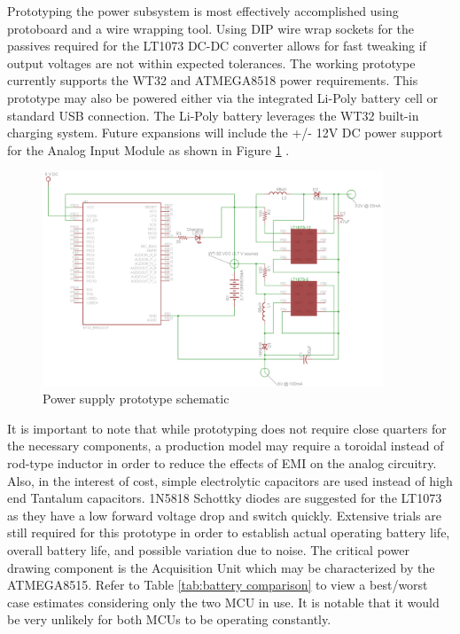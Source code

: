 Prototyping the power subsystem is most effectively accomplished using protoboard and a wire wrapping tool. Using DIP wire wrap sockets for the passives required for the LT1073 DC-DC converter allows for fast tweaking if output voltages are not within expected tolerances. The working prototype currently supports the WT32 and ATMEGA8518 power requirements. This prototype may also be powered either via the integrated Li-Poly battery cell or standard USB connection. The Li-Poly battery leverages the WT32 built-in charging system. Future expansions will include the +/- 12V DC power support for the Analog Input Module as shown in Figure \ref{fig:final_power_schematic} .

\begin{figure}[hbp]
\centering
\includegraphics[width=4in]{../drawings/power_final_sch.png}
\caption[Power Supply]{Power supply prototype schematic}
\label{fig:final_power_schematic}
\end{figure}   

It is important to note that while prototyping does not require close quarters for the necessary components, a production model may require a toroidal instead of rod-type inductor in order to reduce the effects of EMI on the analog circuitry. Also, in the interest of cost, simple electrolytic capacitors are used instead of high end Tantalum capacitors. 1N5818 Schottky diodes are suggested for the LT1073 as they have a low forward voltage drop and switch quickly. Extensive trials are still required for this prototype in order to establish actual operating battery life, overall battery life, and possible variation due to noise. The critical power drawing component is the Acquisition Unit which may be characterized by the ATMEGA8515. Refer to Table \ref{tab:battery comparison} to view a best/worst case estimates considering only the two MCU in use. It is notable that it would be very unlikely for both MCUs to be operating constantly. 

